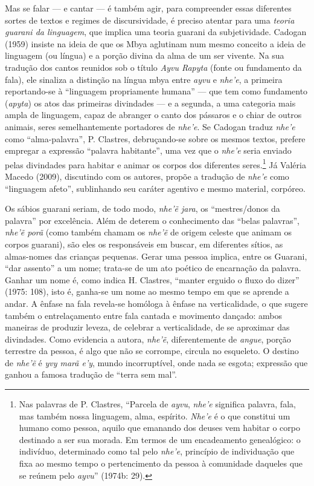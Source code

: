 {{Mas se falar --- e cantar --- é também agir, para compreender essas
diferentes sortes de textos e regimes de discursividade, é preciso
atentar para uma \emph{teoria guarani da linguagem}, que implica uma teoria
guarani da subjetividade. Cadogan (1959) insiste na ideia de que os
Mbya aglutinam num mesmo conceito a ideia de linguagem (ou língua) e a
porção divina da alma de um ser vivente. Na sua tradução dos cantos
reunidos sob o título \emph{Ayvu Rapyta} (fonte ou fundamento da fala), ele
sinaliza a distinção na língua mbya entre \emph{ayvu} e \emph{nhe’e}, a primeira
reportando-se à ``linguagem propriamente humana'' --- que tem como
fundamento (\emph{apyta}) os atos das primeiras divindades --- e a segunda, a
uma categoria mais ampla de linguagem, capaz de abranger o canto dos
pássaros e o chiar de outros animais, seres semelhantemente portadores
de \emph{nhe’e}. Se Cadogan traduz \emph{nhe’e} como ``alma-palavra'', P. Clastres,
debruçando-se sobre os mesmos textos, prefere empregar a expressão
``palavra habitante'', uma vez que o \emph{nhe’e} seria enviado pelas divindades
para habitar e animar os corpos dos diferentes seres.\footnote{Nas
palavras de P. Clastres, ``Parcela de \emph{ayvu}, \emph{nhe’e} significa palavra,
fala, mas também nossa linguagem, alma, espírito. \emph{Nhe’e} é o que
constitui um humano como pessoa, aquilo que emanando dos deuses vem
habitar o corpo destinado a ser sua morada. Em termos de um
encadeamento genealógico: o indivíduo, determinado como tal pelo \emph{nhe’e},
princípio de individuação que fixa ao mesmo tempo o pertencimento da
pessoa à comunidade daqueles que se reúnem pelo \emph{ayvu}'' (1974b: 29).} Já
Valéria Macedo (2009), discutindo com os autores, propõe a tradução de
\emph{nhe’e} como ``linguagem afeto'', sublinhando seu caráter agentivo e mesmo
material, corpóreo. 

Os sábios guarani seriam, de todo modo, \emph{nhe’ẽ jara}, os
``mestres/donos da palavra'' por excelência. Além de deterem o
conhecimento das ``belas palavras'', \emph{nhe’ẽ porã} (como também chamam
os \emph{nhe’ẽ} de origem celeste que animam os corpos guarani), são
eles os responsáveis em buscar, em diferentes sítios, as almas-nomes
das crianças pequenas. Gerar uma pessoa implica, entre os Guarani, ``dar
assento'' a um nome; trata-se de um ato poético de encarnação da
palavra. Ganhar um nome é, como indica H. Clastres, ``manter erguido o
fluxo do dizer'' (1975: 108), isto é, ganha-se um nome ao mesmo tempo em
que se aprende a andar. A ênfase na fala revela-se homóloga à ênfase na
verticalidade, o que sugere também o entrelaçamento entre fala cantada
e movimento dançado: ambos maneiras de produzir leveza, de celebrar a
verticalidade, de se aproximar das divindades. Como evidencia a autora,
\emph{nhe’ẽ}, diferentemente de \emph{angue}, porção terrestre da pessoa, é
algo que não se corrompe, circula no esqueleto. O destino de
\emph{nhe’ẽ} é \emph{yvy marã e’y}, mundo incorruptível, onde nada se esgota;
expressão que ganhou a famosa tradução de ``terra sem mal''.

}}
